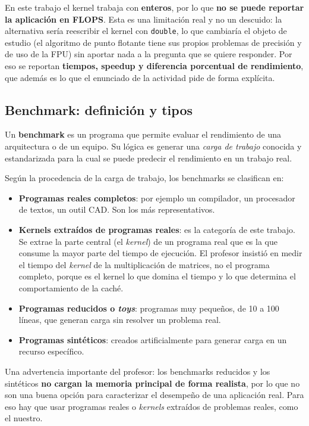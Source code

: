 En este trabajo el kernel trabaja con \textbf{enteros}, por lo que \textbf{no se puede reportar la aplicación en FLOPS}. Esta es una limitación real y no un descuido: la alternativa sería reescribir el kernel con \texttt{double}, lo que cambiaría el objeto de estudio (el algoritmo de punto flotante tiene sus propios problemas de precisión y de uso de la FPU) sin aportar nada a la pregunta que se quiere responder. Por eso se reportan \textbf{tiempos, speedup y diferencia porcentual de rendimiento}, que además es lo que el enunciado de la actividad pide de forma explícita.

\subsection{Benchmark: definición y tipos}

Un \textbf{benchmark} es un programa que permite evaluar el rendimiento de una arquitectura o de un equipo. Su lógica es generar una \emph{carga de trabajo} conocida y estandarizada para la cual se puede predecir el rendimiento en un trabajo real.

Según la procedencia de la carga de trabajo, los benchmarks se clasifican en:

\begin{itemize}
    \item \textbf{Programas reales completos}: por ejemplo un compilador, un procesador de textos, un outil CAD. Son los más representativos.
    \item \textbf{Kernels extraídos de programas reales}: es la categoría de este trabajo. Se extrae la parte central (el \textit{kernel}) de un programa real que es la que consume la mayor parte del tiempo de ejecución. El profesor insistió en medir el tiempo del \emph{kernel} de la multiplicación de matrices, no el programa completo, porque es el kernel lo que domina el tiempo y lo que determina el comportamiento de la caché.
    \item \textbf{Programas reducidos o \textit{toys}}: programas muy pequeños, de 10 a 100 líneas, que generan carga sin resolver un problema real.
    \item \textbf{Programas sintéticos}: creados artificialmente para generar carga en un recurso específico.
\end{itemize}

Una advertencia importante del profesor: los benchmarks reducidos y los sintéticos \textbf{no cargan la memoria principal de forma realista}, por lo que no son una buena opción para caracterizar el desempeño de una aplicación real. Para eso hay que usar programas reales o \emph{kernels} extraídos de problemas reales, como el nuestro.

